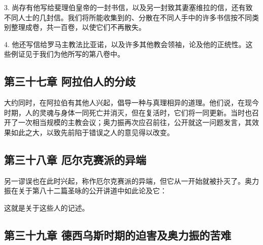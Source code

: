 3. 尚存有他写给斐理伯皇帝的一封书信，以及另一封致其妻塞维拉的信，还有致不同人士的几封信。我们将所能收集到的、分散在不同人手中的许多书信按不同类别整理成卷，共一百卷，以使它们不再散失。\par

4. 他还写信给罗马主教法比亚诺，以及许多其他教会领袖，论及他的正统性。这些例证见于我们为他所写的第八卷中。\par


\subsection{第三十七章 阿拉伯人的分歧}

大约同时，在阿拉伯有其他人兴起，倡导一种与真理相异的道理。他们说，在现今时期，人的灵魂与身体一同死亡并消灭，但在复活时，它们将一同更新。当时也召开了一次相当规模的主教会议；奥力振再次应召前往，公开就这一问题发言，其效果如此之大，以致先前陷于错误之人的意见得以改变。\par


\subsection{第三十八章 厄尔克赛派的异端}

另一谬误也在此时兴起，称作厄尔克赛派的异端，但它从一开始就被扑灭了。奥力振在关于第八十二篇圣咏的公开讲道中如此论及它：\par

这就是关于这些人的记述。\par


\subsection{第三十九章 德西乌斯时期的迫害及奥力振的苦难}

